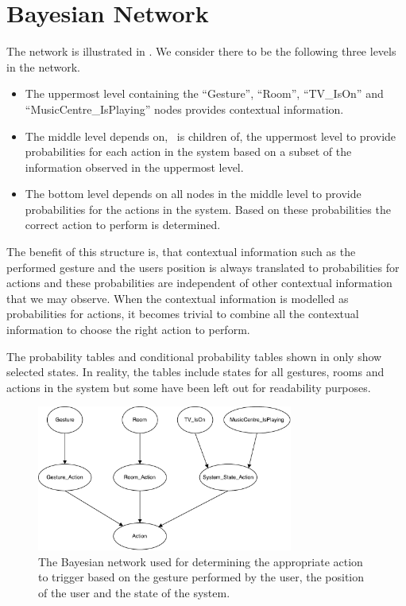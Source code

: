 \section{Bayesian Network}
\label{sec:design:bayesian-network}

The network is illustrated in . We consider there to be the following three levels in the network.

\begin{itemize}
\item The uppermost level containing the ``Gesture'', ``Room'', ``TV\_IsOn'' and ``MusicCentre\_IsPlaying'' nodes provides contextual information.
\item The middle level depends on, \ie~is children of, the uppermost level to provide probabilities for each action in the system based on a subset of the information observed in the uppermost level.
\item The bottom level depends on all nodes in the middle level to provide probabilities for the actions in the system. Based on these probabilities the correct action to perform is determined.
\end{itemize}

The benefit of this structure is, that contextual information such as the performed gesture and the users position is always translated to probabilities for actions and these probabilities are independent of other contextual information that we may observe. When the contextual information is modelled as probabilities for actions, it becomes trivial to combine all the contextual information to choose the right action to perform.

The probability tables and conditional probability tables shown in  only show selected states. In reality, the tables include states for all gestures, rooms and actions in the system but some have been left out for readability purposes.

\begin{figure}[h!]
\centering
\includegraphics[width=0.75\textwidth]{images/bayesian-network}
\caption{The Bayesian network used for determining the appropriate action to trigger based on the gesture performed by the user, the position of the user and the state of the system.}
\label{fig:design:bayesian-network:overview}
\end{figure}


